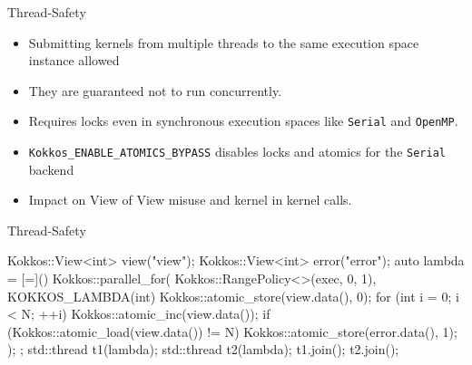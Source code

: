 
\begin{frame}[fragile]{Thread-Safety}
  \begin{itemize}
    \item Submitting kernels from multiple threads to the same execution space instance allowed
    \item They are guaranteed not to run concurrently. 
    \item Requires locks even in synchronous execution spaces like \texttt{Serial} and \texttt{OpenMP}.
    \item \texttt{Kokkos\_ENABLE\_ATOMICS\_BYPASS} disables locks and atomics for the \texttt{Serial} backend
    \item Impact on View of View misuse and kernel in kernel calls.
  \end{itemize}
\end{frame}

\begin{frame}[fragile]{Thread-Safety}
\begin{code}
  Kokkos::View<int> view("view");
  Kokkos::View<int> error("error");
  auto lambda = [=]() {
    Kokkos::parallel_for(
      Kokkos::RangePolicy<>(exec, 0, 1), KOKKOS_LAMBDA(int) {
          Kokkos::atomic_store(view.data(), 0);
          for (int i = 0; i < N; ++i) Kokkos::atomic_inc(view.data());
          if (Kokkos::atomic_load(view.data()) != N)
            Kokkos::atomic_store(error.data(), 1);
        });
  };
  std::thread t1(lambda);
  std::thread t2(lambda);
  t1.join();
  t2.join();
\end{code}
\end{frame}


